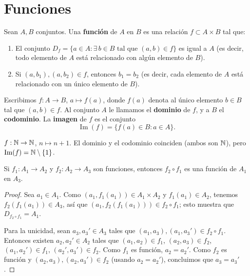 \documentclass[12pt,a4paper]{book}
\begin{document}
    \section{Funciones}

    \begin{definicion}[Función]
        Sean $A,B$ conjuntos. Una \textbf{función} de $A$ en $B$ es una relación $f\subset A\times B$ tal que:
        \begin{enumerate}[label=(\arabic*)]
            \item El conjunto $D_f = \{a\in A : \exists\, b\in B \text{ tal que } (a,b)\in f\}$ es igual a $A$ (es decir, todo elemento de $A$ está relacionado con algún elemento de $B$).
            \item Si $(a,b_1),(a,b_2)\in f$, entonces $b_1=b_2$ (es decir, cada elemento de $A$ está relacionado con un único elemento de $B$).
        \end{enumerate}
    \end{definicion}

    Escribimos $f:A\to B$, $a\mapsto f(a)$, donde $f(a)$ denota al único elemento $b\in B$ tal que $(a,b)\in f$. Al conjunto $A$ le llamamos el \textbf{dominio} de $f$, y a $B$ el \textbf{codominio}. La \textbf{imagen} de $f$ es el conjunto
    \begin{equation*}
        \operatorname{Im}(f) = \{f(a)\in B : a\in A\}.
    \end{equation*}

    \begin{ejemplo}
        $f:\mathbb{N}\to\mathbb{N}$, $n\mapsto n+1$. El dominio y el codominio coinciden (ambos son $\mathbb{N}$), pero $\operatorname{Im}(f)=\mathbb{N}\setminus\{1\}$.
    \end{ejemplo}

    \begin{proposicion}
        Si $f_1:A_1\to A_2$ y $f_2:A_2\to A_3$ son funciones, entonces $f_2\circ f_1$ es una función de $A_1$ en $A_3$.
    \end{proposicion}

    \begin{proof}
        Sea $a_1\in A_1$. Como $(a_1,f_1(a_1))\in A_1\times A_2$ y $f_1(a_1)\in A_2$, tenemos $f_2(f_1(a_1))\in A_3$, así que $(a_1,f_2(f_1(a_1)))\in f_2\circ f_1$; esto muestra que $D_{f_2\circ f_1}=A_1$.

        Para la unicidad, sean $a_3,a_3'\in A_3$ tales que $(a_1,a_3),(a_1,a_3')\in f_2\circ f_1$. Entonces existen $a_2,a_2'\in A_2$ tales que $(a_1,a_2)\in f_1$, $(a_2,a_3)\in f_2$, $(a_1,a_2')\in f_1$, $(a_2',a_3')\in f_2$. Como $f_1$ es función, $a_2=a_2'$. Como $f_2$ es función y $(a_2,a_3),(a_2,a_3')\in f_2$ (usando $a_2=a_2'$), concluimos que $a_3=a_3'$.
    \end{proof}
\end{document}
